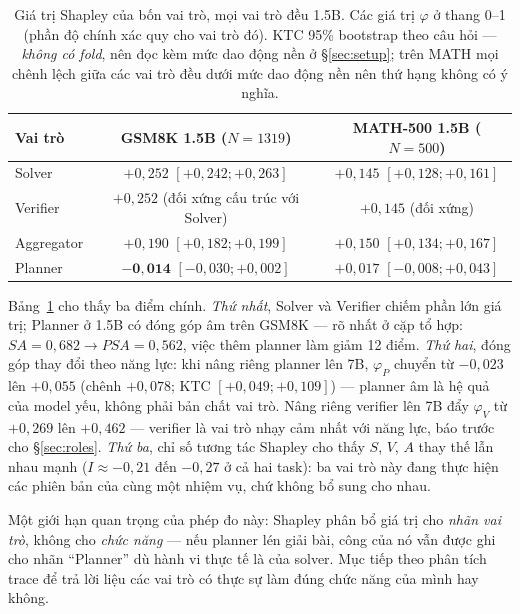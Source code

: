 \begin{table}[h]\centering\small
\begin{tabular}{@{}l c c@{}}
\toprule
Vai trò & GSM8K 1.5B ($N=1319$) & MATH-500 1.5B ($N=500$)\\
\midrule
Solver     & $+0{,}252$ $[+0{,}242;+0{,}263]$ & $+0{,}145$ $[+0{,}128;+0{,}161]$\\
Verifier   & $+0{,}252$ (đối xứng cấu trúc với Solver) & $+0{,}145$ (đối xứng)\\
Aggregator & $+0{,}190$ $[+0{,}182;+0{,}199]$ & $+0{,}150$ $[+0{,}134;+0{,}167]$\\
Planner    & $\mathbf{-0{,}014}$ $[-0{,}030;+0{,}002]$ & $+0{,}017$ $[-0{,}008;+0{,}043]$\\
\bottomrule
\end{tabular}
\caption{Giá trị Shapley của bốn vai trò, mọi vai trò đều 1.5B. Các giá trị $\varphi$ ở thang 0--1
(phần độ chính xác quy cho vai trò đó). KTC 95\% bootstrap theo câu hỏi --- \emph{không có fold},
nên đọc kèm mức dao động nền ở \S\ref{sec:setup}; trên MATH mọi chênh lệch giữa các vai trò đều dưới
mức dao động nền nên thứ hạng không có ý nghĩa.}
\label{tab:shapley}
\end{table}

Bảng~\ref{tab:shapley} cho thấy ba điểm chính. \emph{Thứ nhất}, Solver và Verifier chiếm phần lớn giá trị; Planner ở 1.5B có đóng góp âm trên GSM8K --- rõ nhất ở cặp tổ hợp: $SA = 0{,}682 \to PSA = 0{,}562$, việc thêm planner làm giảm 12 điểm. \emph{Thứ hai}, đóng góp thay đổi theo năng lực: khi nâng riêng planner lên 7B, $\varphi_P$ chuyển từ $-0{,}023$ lên $+0{,}055$ (chênh $+0{,}078$; KTC $[+0{,}049;+0{,}109]$) --- planner âm là hệ quả của model yếu, không phải bản chất vai trò. Nâng riêng verifier lên 7B đẩy $\varphi_V$ từ $+0{,}269$ lên $+0{,}462$ --- verifier là vai trò nhạy cảm nhất với năng lực, báo trước cho \S\ref{sec:roles}. \emph{Thứ ba}, chỉ số tương tác Shapley cho thấy $S$, $V$, $A$ thay thế lẫn nhau mạnh ($I \approx -0{,}21$ đến $-0{,}27$ ở cả hai task): ba vai trò này đang thực hiện các phiên bản của cùng một nhiệm vụ, chứ không bổ sung cho nhau.

Một giới hạn quan trọng của phép đo này: Shapley phân bổ giá trị cho \emph{nhãn vai trò}, không cho \emph{chức năng} --- nếu planner lén giải bài, công của nó vẫn được ghi cho nhãn ``Planner'' dù hành vi thực tế là của solver. Mục tiếp theo phân tích trace để trả lời liệu các vai trò có thực sự làm đúng chức năng của mình hay không.

